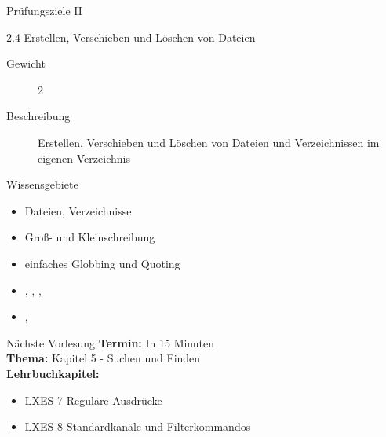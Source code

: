\documentclass[aspectratio=43]{beamer}
\begin{document}
\begin{frame}{Prüfungsziele II}
  \begin{alertblock}{2.4 Erstellen, Verschieben und Löschen von Dateien}
    \begin{description}
      \item[Gewicht]  2
      \item[Beschreibung] Erstellen, Verschieben und Löschen von Dateien und Verzeichnissen im eigenen Verzeichnis
    \end{description}
       Wissensgebiete\\ 
        \begin{itemize}
          \item Dateien, Verzeichnisse
          \item Groß- und Kleinschreibung
          \item einfaches Globbing und Quoting
          \item {}, , , 
          \item {}, 
        \end{itemize}
  \end{alertblock}
\end{frame}
\begin{frame}[plain]
  \begin{alertblock}{Nächste Vorlesung}
    \textbf{Termin:} In 15 Minuten\\
    \textbf{Thema:} Kapitel 5 - Suchen und Finden \\
    \textbf{Lehrbuchkapitel:} 
    \begin{itemize}
      \item LXES 7 Reguläre Ausdrücke
      \item LXES 8 Standardkanäle und Filterkommandos
    \end{itemize}
  \end{alertblock}
\end{frame}

\materialframe
\versionframe
\end{document}
